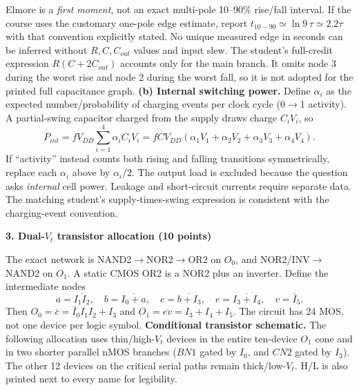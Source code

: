 \documentclass[10pt]{article}
\newcommand{\qheading}[1]{\par\medskip\textbf{#1}\par}
\begin{document}
Elmore is a \emph{first moment}, not an exact multi-pole 10--90\% rise/fall interval. If the course uses the customary one-pole edge estimate, report $t_{10-90}\simeq\ln9\,\tau\simeq2.2\tau$ with that convention explicitly stated. No unique measured edge in seconds can be inferred without $R,C,C_{out}$ values and input slew.
The student's full-credit expression $R(C+2C_{out})$ accounts only for the main branch. It omits node 3 during the worst rise and node 2 during the worst fall, so it is not adopted for the printed full capacitance graph.
\textbf{(b) Internal switching power.} Define $\alpha_i$ as the expected number/probability of charging events per clock cycle (0$\to$1 activity). A partial-swing capacitor charged from the supply draws charge $C_iV_i$, so
\[\boxed{P_{int}=fV_{DD}\sum_{i=1}^{4}\alpha_i C_iV_i
=fCV_{DD}(\alpha_1V_1+\alpha_2V_2+\alpha_3V_3+\alpha_4V_4).}\]
If ``activity'' instead counts both rising and falling transitions symmetrically, replace each $\alpha_i$ above by $\alpha_i/2$. The output load is excluded because the question asks \emph{internal} cell power. Leakage and short-circuit currents require separate data. The matching student's supply-times-swing expression is consistent with the charging-event convention.
\newpage
\qheading{3. Dual-$V_t$ transistor allocation (10 points)}
The exact network is NAND2$\to$NOR2$\to$OR2 on $O_0$, and NOR2/INV$\to$NAND2 on $O_1$. A static CMOS OR2 is a NOR2 plus an inverter. Define the intermediate nodes
\[a=\overline{I_1I_2},\quad b=\overline{I_0+a},\quad c=\overline{b+I_3},\quad e=\overline{I_3+I_4},\quad v=\bar I_5.\]
Then $O_0=\bar c=\bar I_0I_1I_2+I_3$ and $O_1=\overline{ev}=I_3+I_4+I_5$. The circuit has 24 MOS, not one device per logic symbol.
\textbf{Conditional transistor schematic.} The following allocation uses thin/high-$V_t$ devices in the entire ten-device $O_1$ cone and in two shorter parallel nMOS branches ($BN1$ gated by $I_0$, and $CN2$ gated by $I_3$). The other 12 devices on the critical serial paths remain thick/low-$V_t$. H/L is also printed next to every name for legibility.
\end{document}
